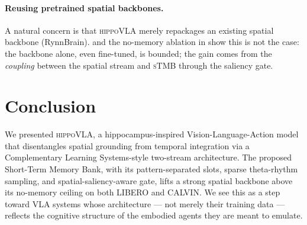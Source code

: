 \documentclass[10pt,letterpaper]{article}
\newcommand{\method}{\textsc{hippoVLA}\xspace}
\newcommand{\sTMB}{\textsc{sTMB}\xspace}
\begin{document}
\paragraph{Reusing pretrained spatial backbones.}
A natural concern is that \method merely repackages an existing spatial backbone (RynnBrain).  and the no-memory ablation in  show this is not the case: the backbone alone, even fine-tuned, is bounded; the gain comes from the \emph{coupling} between the spatial stream and \sTMB through the saliency gate.

\section{Conclusion}

We presented \method, a hippocampus-inspired Vision-Language-Action model that disentangles spatial grounding from temporal integration via a Complementary Learning Systems-style two-stream architecture. The proposed Short-Term Memory Bank, with its pattern-separated slots, sparse theta-rhythm sampling, and spatial-saliency-aware gate, lifts a strong spatial backbone above its no-memory ceiling on both LIBERO and CALVIN. We see this as a step toward VLA systems whose architecture --- not merely their training data --- reflects the cognitive structure of the embodied agents they are meant to emulate.
\end{document}
